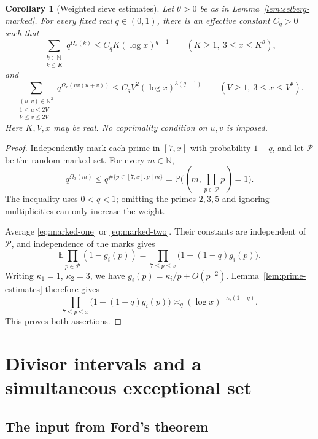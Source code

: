 \documentclass[11pt]{article}
\newtheorem{corollary}[theorem]{Corollary}
\theoremstyle{definition}
\theoremstyle{remark}
\numberwithin{equation}{section}
\newcommand{\N}{\mathbb N}
\begin{document}
\begin{corollary}[Weighted sieve estimates]\label{cor:weighted}
Let \(\theta>0\) be as in Lemma~\ref{lem:selberg-marked}.
For every fixed real \(q\in(0,1)\), there is an effective constant
\(C_q>0\) such that
\begin{equation}\label{eq:weighted-one}
 \sum_{\substack{k\in\N\\k\le K}}q^{\Omega_x(k)}
 \le C_qK(\log x)^{q-1}
 \qquad(K\ge1,\ 3\le x\le K^\theta),
\end{equation}
and
\begin{equation}\label{eq:weighted-two}
 \sum_{\substack{(u,v)\in\N^2\\1\le u\le2V\\V\le v\le2V}}
 q^{\Omega_x(uv(u+v))}
 \le C_qV^2(\log x)^{3(q-1)}
 \qquad(V\ge1,\ 3\le x\le V^\theta).
\end{equation}
Here \(K,V,x\) may be real. No coprimality condition on \(u,v\)
is imposed.
\end{corollary}

\begin{proof}
Independently mark each prime in \([7,x]\) with probability \(1-q\),
and let \(\mathcal P\) be the random marked set. For every
\(m\in\N\),
\[
 q^{\Omega_x(m)}
 \le q^{\#\{p\in[7,x]:p\mid m\}}
 =\mathbb P\bigl((m,\prod_{p\in\mathcal P}p)=1\bigr).
\]
The inequality uses \(0<q<1\); omitting the primes \(2,3,5\)
and ignoring multiplicities can only increase the weight.

Average \eqref{eq:marked-one} or \eqref{eq:marked-two}. Their
constants are independent of \(\mathcal P\), and independence
of the marks gives
\[
 \mathbb E\prod_{p\in\mathcal P}(1-g_i(p))
 =\prod_{7\le p\le x}\bigl(1-(1-q)g_i(p)\bigr).
\]
Writing \(\kappa_1=1\), \(\kappa_2=3\), we have
\(g_i(p)=\kappa_i/p+O(p^{-2})\). Lemma~\ref{lem:prime-estimates}
therefore gives
\[
 \prod_{7\le p\le x}\bigl(1-(1-q)g_i(p)\bigr)
 \asymp_q(\log x)^{-\kappa_i(1-q)}.
\]
This proves both assertions.
\end{proof}

\section{Divisor intervals and a simultaneous exceptional set}

\subsection{The input from Ford's theorem}
\end{document}
